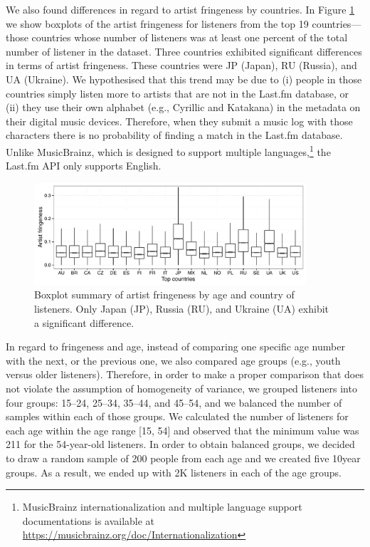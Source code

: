 We also found differences in regard to artist fringeness by countries. In Figure \ref{fig:artist_fringeness_by_country} we show boxplots of the artist fringeness for listeners from the top 19 countries---those countries whose number of listeners was at least one percent of the total number of listener in the dataset.
Three countries exhibited significant differences in terms of artist fringeness. These countries were JP (Japan), RU (Russia), and UA (Ukraine).
We hypothesised that this trend may be due to (i) people in those countries simply listen more to artists that are not in the Last.fm database, or (ii) they use their own alphabet (e.g., Cyrillic and Katakana) in the metadata on their digital music devices. Therefore, when they submit a music log with those characters there is no probability of finding a match in the Last.fm database. Unlike MusicBrainz, which is designed to support multiple languages,\footnote{MusicBrainz internationalization and multiple language support documentations is available at \url{https://musicbrainz.org/doc/Internationalization}} the Last.fm API only supports English. 


\graphicspath{{./figs/ch6/}}
\begin{figure}[tbp]
\centering
\includegraphics[width = 0.9\textwidth]{artist_fringeness_by_country.pdf}
\caption[Summary of artist fringeness by age and country of listeners]{Boxplot summary of artist fringeness by age and country of listeners. Only Japan (JP), Russia (RU), and Ukraine (UA) exhibit a significant difference.}
\label{fig:artist_fringeness_by_country}
\end{figure}





In regard to fringeness and age, instead of comparing one specific age number with the next, or the previous one, we also compared age groups (e.g., youth versus older listeners).
Therefore, in order to make a proper comparison that does not violate the assumption of homogeneity of variance, we grouped listeners into four groups: 15--24, 25--34, 35--44, and 45--54, and we balanced the number of samples within each of those groups.
We calculated the number of listeners for each age within the age range [15, 54] and observed that the minimum value was 211 for the 54-year-old listeners. 
In order to obtain balanced groups, we decided to draw a random sample of 200 people from each age and we created five 10year groups. As a result, we ended up with 2K listeners in each of the age groups.

